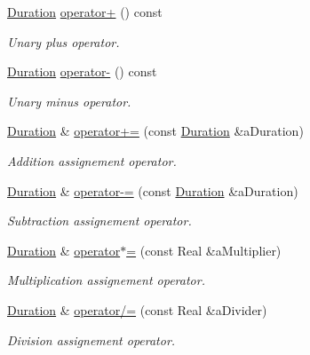 \begin{DoxyCompactItemize}
\hyperlink{classlibrary_1_1physics_1_1time_1_1_duration}{Duration} \hyperlink{classlibrary_1_1physics_1_1time_1_1_duration_a315c20670e53373e2d9f47ff07c6c09c}{operator+} () const
\begin{DoxyCompactList}\small\item\em Unary plus operator. \end{DoxyCompactList}\item 
\hyperlink{classlibrary_1_1physics_1_1time_1_1_duration}{Duration} \hyperlink{classlibrary_1_1physics_1_1time_1_1_duration_a9f2fa54832b4ef58c48167c80285bad2}{operator-\/} () const
\begin{DoxyCompactList}\small\item\em Unary minus operator. \end{DoxyCompactList}\item 
\hyperlink{classlibrary_1_1physics_1_1time_1_1_duration}{Duration} \& \hyperlink{classlibrary_1_1physics_1_1time_1_1_duration_a2d2848688c326591ea1a406e5a0275d0}{operator+=} (const \hyperlink{classlibrary_1_1physics_1_1time_1_1_duration}{Duration} \&a\+Duration)
\begin{DoxyCompactList}\small\item\em Addition assignement operator. \end{DoxyCompactList}\item 
\hyperlink{classlibrary_1_1physics_1_1time_1_1_duration}{Duration} \& \hyperlink{classlibrary_1_1physics_1_1time_1_1_duration_a49e7a4be10cf8cade127314a80b4180e}{operator-\/=} (const \hyperlink{classlibrary_1_1physics_1_1time_1_1_duration}{Duration} \&a\+Duration)
\begin{DoxyCompactList}\small\item\em Subtraction assignement operator. \end{DoxyCompactList}\item 
\hyperlink{classlibrary_1_1physics_1_1time_1_1_duration}{Duration} \& \hyperlink{classlibrary_1_1physics_1_1time_1_1_duration_a510b18495d52c34ebd34e3bb9bf723e6}{operator$\ast$=} (const Real \&a\+Multiplier)
\begin{DoxyCompactList}\small\item\em Multiplication assignement operator. \end{DoxyCompactList}\item 
\hyperlink{classlibrary_1_1physics_1_1time_1_1_duration}{Duration} \& \hyperlink{classlibrary_1_1physics_1_1time_1_1_duration_a0f57d9d0934d6851e3956744f2e85b48}{operator/=} (const Real \&a\+Divider)
\begin{DoxyCompactList}\small\item\em Division assignement operator. \end{DoxyCompactList}\item 

\end{DoxyCompactItemize}
